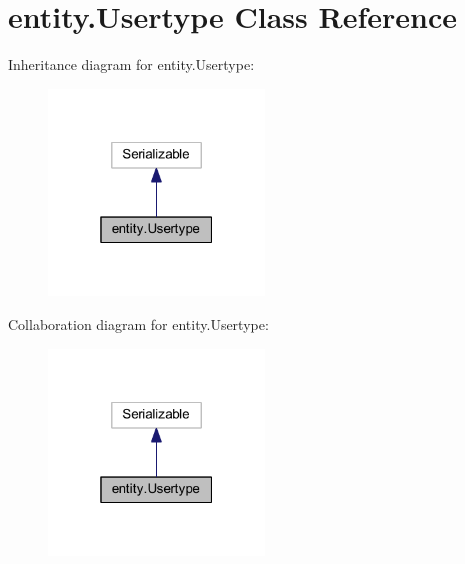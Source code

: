 \hypertarget{classentity_1_1_usertype}{}\section{entity.\+Usertype Class Reference}
\label{classentity_1_1_usertype}


Inheritance diagram for entity.\+Usertype\+:\nopagebreak
\begin{figure}[H]
\begin{center}
\leavevmode
\includegraphics[width=163pt]{classentity_1_1_usertype__inherit__graph}
\end{center}
\end{figure}


Collaboration diagram for entity.\+Usertype\+:\nopagebreak
\begin{figure}[H]
\begin{center}
\leavevmode
\includegraphics[width=163pt]{classentity_1_1_usertype__coll__graph}
\end{center}
\end{figure}
